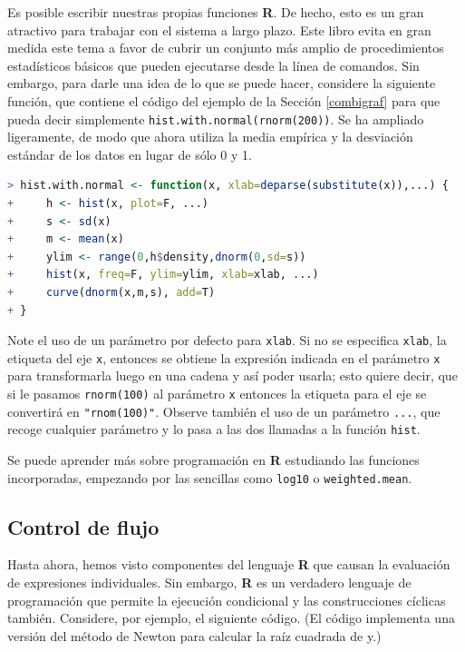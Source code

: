 Es posible escribir nuestras propias funciones \textbf{R}. De hecho, esto es un
gran atractivo para trabajar con el sistema a largo plazo. Este libro evita en
gran medida este tema a favor de cubrir un conjunto más amplio de
procedimientos estadísticos básicos que pueden ejecutarse desde la línea de
comandos. Sin embargo, para darle una idea de lo que se puede hacer, considere
la siguiente función, que contiene el código del ejemplo de la Sección
\ref{combigraf} para que pueda decir simplemente
\texttt{hist.with.normal(rnorm(200))}. Se ha ampliado ligeramente, de modo que
ahora utiliza la media empírica y la desviación estándar de los datos en lugar
de sólo 0 y 1.

\begin{lstlisting}[language=R]
> hist.with.normal <- function(x, xlab=deparse(substitute(x)),...) {
+     h <- hist(x, plot=F, ...)
+     s <- sd(x)
+     m <- mean(x)
+     ylim <- range(0,h$density,dnorm(0,sd=s))
+     hist(x, freq=F, ylim=ylim, xlab=xlab, ...)
+     curve(dnorm(x,m,s), add=T)
+ }
\end{lstlisting}

Note el uso de un parámetro por defecto para \texttt{xlab}. Si no se especifica
\texttt{xlab}, la etiqueta del eje \texttt{x}, entonces se obtiene la expresión
indicada en el parámetro \texttt{x} para transformarla luego en una cadena y así
poder usarla; esto quiere decir, que si le pasamos \texttt{rnorm(100)} al
parámetro \texttt{x} entonces la etiqueta para el eje se convertirá en
\texttt{"rnom(100)"}. Observe también el uso de un parámetro \texttt{...}, que
recoge cualquier parámetro  y lo pasa a las dos llamadas a la función
\texttt{hist}.

Se puede aprender más sobre programación en \textbf{R} estudiando las funciones
incorporadas, empezando por las sencillas como \texttt{log10} o
\texttt{weighted.mean}.
\newpage

\subsection{Control de flujo} \label{flowcontrol}

Hasta ahora, hemos visto componentes del lenguaje \textbf{R} que causan la
evaluación de expresiones individuales. Sin embargo, \textbf{R} es un verdadero
lenguaje de programación que permite la ejecución condicional y las
construcciones cíclicas también. Considere, por ejemplo, el siguiente código.
(El código implementa una versión del método de Newton para calcular la raíz
cuadrada de y.)

